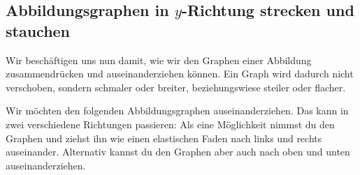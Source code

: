 \documentclass[../../main.tex]{subfiles}
\begin{document}
\subsection{Abbildungsgraphen in \texorpdfstring{$y$}{y}-Richtung strecken und stauchen}
\label{sec:abbildungen_strecken_y}

Wir beschäftigen uns nun damit, wie wir den Graphen einer Abbildung zusammendrücken und auseinanderziehen können. Ein Graph wird dadurch nicht verschoben, sondern schmaler oder breiter, beziehungswiese steiler oder flacher.

\begin{example}{}
    Wir möchten den folgenden Abbildungsgraphen auseinanderziehen. Das kann in zwei verschiedene Richtungen passieren: Als eine Möglichkeit nimmst du den Graphen und ziehst ihn wie einen elastischen Faden nach links und rechts auseinander. Alternativ kannst du den Graphen aber auch nach oben und unten auseinanderziehen.
    \begin{multicols}{2}\centering
        

\end{multicols}
\end{example}
\end{document}
